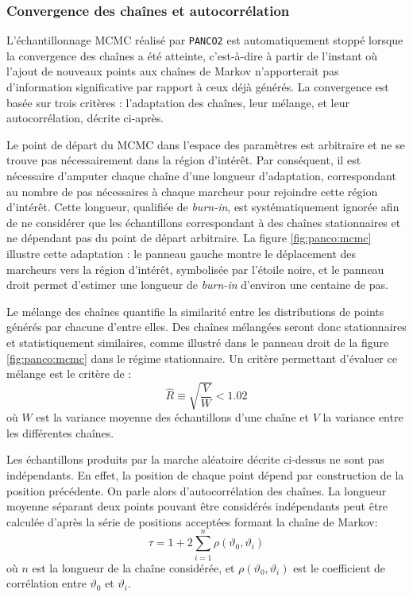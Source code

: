 \subsubsection{Convergence des chaînes et autocorrélation} %
L'échantillonnage MCMC réalisé par \texttt{PANCO2} est automatiquement stoppé lorsque la convergence des chaînes a été atteinte, c'est-à-dire à partir de l'instant où l'ajout de nouveaux points aux chaînes de Markov n'apporterait pas d'information significative par rapport à ceux déjà générés.
La convergence est basée sur trois critères : l'adaptation des chaînes, leur mélange, et leur autocorrélation, décrite ci-après.

Le point de départ du MCMC dans l'espace des paramètres est arbitraire et ne se trouve pas nécessairement dans la région d'intérêt.
Par conséquent, il est nécessaire d'amputer chaque chaîne d'une longueur d'adaptation, correspondant au nombre de pas nécessaires à chaque marcheur pour rejoindre cette région d'intérêt.
Cette longueur, qualifiée de \textit{burn-in}, est systématiquement ignorée afin de ne considérer que les échantillons correspondant à des chaînes stationnaires et ne dépendant pas du point de départ arbitraire.
La figure \ref{fig:panco:mcmc} illustre cette adaptation : le panneau gauche montre le déplacement des marcheurs vers la région d'intérêt, symbolisée par l'étoile noire, et le panneau droit permet d'estimer une longueur de \textit{burn-in} d'environ une centaine de pas.

Le mélange des chaînes quantifie la similarité entre les distributions de points générés par chacune d'entre elles.
Des chaînes mélangées seront donc stationnaires et statistiquement similaires, comme illustré dans le panneau droit de la figure \ref{fig:panco:mcmc} dans le régime stationnaire.
Un critère permettant d'évaluer ce mélange est le critère de :
\begin{equation}
    \label{eq:panco:rhat}
    \hat{R} \equiv \sqrt{\frac{V}{W}} < 1.02
\end{equation}
où $W$ est la variance moyenne des échantillons d'une chaîne et $V$ la variance entre les différentes chaînes.

Les échantillons produits par la marche aléatoire décrite ci-dessus ne sont pas indépendants.
En effet, la position de chaque point dépend par construction de la position précédente.
On parle alors d'autocorrélation des chaînes.
La longueur moyenne séparant deux points pouvant être considérés indépendants peut être calculée d'après la série de positions acceptées formant la chaîne de Markov:
\begin{equation}
    \tau = 1 + 2 \sum_{i=1}^{n} \rho(\vartheta_0, \vartheta_i)
\end{equation}
où $n$ est la longueur de la chaîne considérée, et $\rho(\vartheta_0, \vartheta_i)$ est le coefficient de corrélation entre $\vartheta_0$ et $\vartheta_i$.

